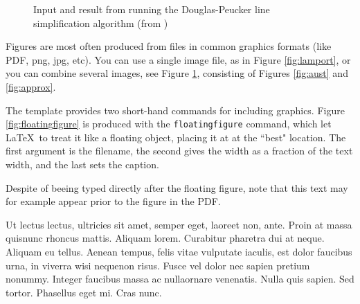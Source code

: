 \begin{figure}[!htbp]
  \begin{center}
  \end{center}
  \caption{Input and result from running the Douglas-Peucker line simplification algorithm (from  \cite{kjeldsen05cor})}
  \label{fig:dpaustralia}
\end{figure}

Figures are most often produced from files in common graphics formats (like PDF, png, jpg, etc). You can use a single image file, as in Figure \ref{fig:lamport}, or you can combine several images, see Figure \ref{fig:dpaustralia}, consisting of Figures \ref{fig:aust} and \ref{fig:approx}.

The template provides two short-hand commands for including graphics. Figure \ref{fig:floatingfigure} is produced with the \texttt{floatingfigure} command, which let \LaTeX\ to treat it like a floating object, placing it at at the ``best" location. The first argument is the filename, the second gives the width as a fraction of the text width, and the last sets the caption.

\label{fig:floatingfigure}

Despite of beeing typed directly after the floating figure, note that this text may for example appear prior to the figure in the PDF.

Ut lectus lectus, ultricies sit amet, semper eget, laoreet non, ante. Proin at massa quisnunc rhoncus mattis. Aliquam lorem. Curabitur pharetra dui at neque. Aliquam eu tellus. Aenean tempus, felis vitae vulputate iaculis, est dolor faucibus urna, in viverra wisi nequenon risus. Fusce vel dolor nec sapien pretium nonummy. Integer faucibus massa ac nullaornare venenatis. Nulla quis sapien. Sed tortor. Phasellus eget mi. Cras nunc.

